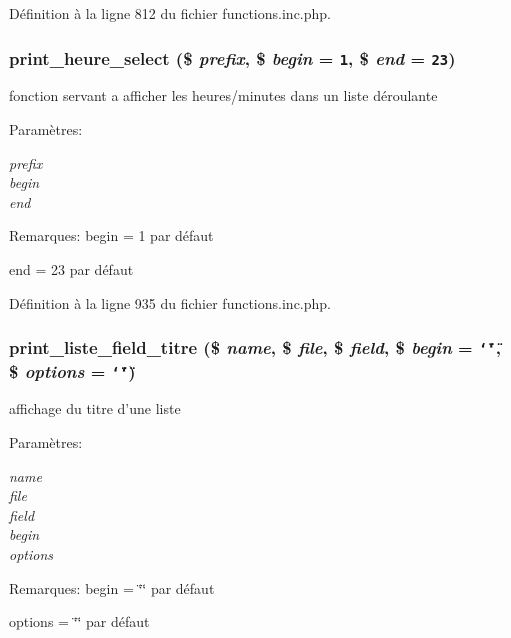 D\'{e}finition \`{a} la ligne 812 du fichier functions.inc.php.\hypertarget{functions_8inc_8php_a36}{
\subsubsection[print\_\-heure\_\-select]{\setlength{\rightskip}{0pt plus 5cm}print\_\-heure\_\-select (\$ {\em prefix}, \$ {\em begin} = {\tt 1}, \$ {\em end} = {\tt 23})}}
\label{functions_8inc_8php_a36}


fonction servant a afficher les heures/minutes dans un liste d\'{e}roulante 

\begin{Desc}
\item[Param\`{e}tres:]
\begin{description}
\item[{\em prefix}]\item[{\em begin}]\item[{\em end}]\end{description}
\end{Desc}
\begin{Desc}
\item[Remarques:]begin = 1 par d\'{e}faut 

end = 23 par d\'{e}faut \end{Desc}


D\'{e}finition \`{a} la ligne 935 du fichier functions.inc.php.\hypertarget{functions_8inc_8php_a26}{
\subsubsection[print\_\-liste\_\-field\_\-titre]{\setlength{\rightskip}{0pt plus 5cm}print\_\-liste\_\-field\_\-titre (\$ {\em name}, \$ {\em file}, \$ {\em field}, \$ {\em begin} = {\tt \char`\"{}\char`\"{}}, \$ {\em options} = {\tt \char`\"{}\char`\"{}})}}
\label{functions_8inc_8php_a26}


affichage du titre d'une liste 

\begin{Desc}
\item[Param\`{e}tres:]
\begin{description}
\item[{\em name}]\item[{\em file}]\item[{\em field}]\item[{\em begin}]\item[{\em options}]\end{description}
\end{Desc}
\begin{Desc}
\item[Remarques:]begin = \char`\"{}\char`\"{} par d\'{e}faut 

options = \char`\"{}\char`\"{} par d\'{e}faut \end{Desc}


